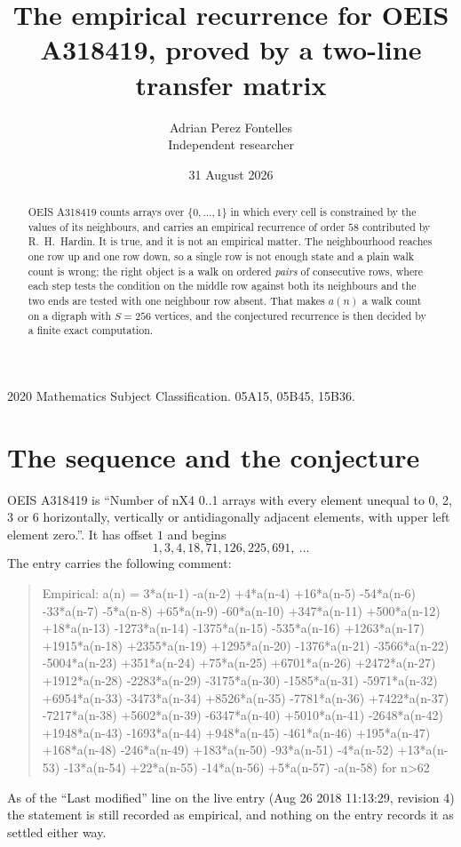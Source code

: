 \documentclass[11pt,a4paper]{article}
\title{The empirical recurrence for OEIS A318419, proved by a two-line transfer matrix}
\author{Adrian Perez Fontelles\\ \small Independent researcher}
\date{31 August 2026}
\theoremstyle{plain}
\theoremstyle{definition}
\begin{document}
\maketitle

\begin{abstract}
OEIS A318419 counts arrays over $\{0,\dots,1\}$ in which every cell is constrained by the
values of its neighbours, and carries an empirical recurrence of order $58$ contributed
by R.~H.~Hardin. It is true, and it is not an empirical matter. The neighbourhood reaches one
row up and one row down, so a single row is not enough state and a plain walk count
is wrong; the right object is a walk on ordered \emph{pairs} of consecutive rows, where
each step tests the condition on the middle row against both its neighbours and the two
ends are tested with one neighbour row absent. That makes $a(n)$ a walk count on a digraph
with $S=256$ vertices, and the conjectured recurrence is then decided by a finite exact
computation.
\end{abstract}

\noindent\small 2020 Mathematics Subject Classification. 05A15, 05B45, 15B36.\normalsize

\section{The sequence and the conjecture}

OEIS A318419 is ``Number of nX4 0..1 arrays with every element unequal to 0, 2, 3 or 6 horizontally, vertically or antidiagonally adjacent elements, with upper left element zero.''. It has offset $1$ and begins
\[
1, 3, 4, 18, 71, 126, 225, 691,\ \dots
\]
The entry carries the following comment:
\begin{quote}\small
Empirical: a(n) = 3*a(n-1) -a(n-2) +4*a(n-4) +16*a(n-5) -54*a(n-6) -33*a(n-7) -5*a(n-8) +65*a(n-9) -60*a(n-10) +347*a(n-11) +500*a(n-12) +18*a(n-13) -1273*a(n-14) -1375*a(n-15) -535*a(n-16) +1263*a(n-17) +1915*a(n-18) +2355*a(n-19) +1295*a(n-20) -1376*a(n-21) -3566*a(n-22) -5004*a(n-23) +351*a(n-24) +75*a(n-25) +6701*a(n-26) +2472*a(n-27) +1912*a(n-28) -2283*a(n-29) -3175*a(n-30) -1585*a(n-31) -5971*a(n-32) +6954*a(n-33) -3473*a(n-34) +8526*a(n-35) -7781*a(n-36) +7422*a(n-37) -7217*a(n-38) +5602*a(n-39) -6347*a(n-40) +5010*a(n-41) -2648*a(n-42) +1948*a(n-43) -1693*a(n-44) +948*a(n-45) -461*a(n-46) +195*a(n-47) +168*a(n-48) -246*a(n-49) +183*a(n-50) -93*a(n-51) -4*a(n-52) +13*a(n-53) -13*a(n-54) +22*a(n-55) -14*a(n-56) +5*a(n-57) -a(n-58) for n>62
\end{quote}
As of the ``Last modified'' line on the live entry (Aug 26 2018 11:13:29, revision 4) the statement is
still recorded as empirical, and nothing on the entry records it as settled either way.
\end{document}
